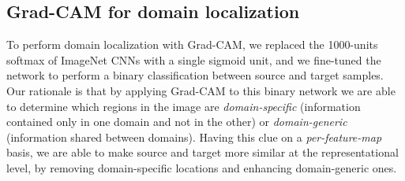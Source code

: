 \documentclass[../main.tex]{subfiles}
\begin{document}
    \subsection{Grad-CAM for domain localization}

    To perform domain localization with Grad-CAM, we replaced the 1000-units softmax of ImageNet CNNs with a single sigmoid
    unit, and we fine-tuned the network to perform a binary classification between source and target samples. Our rationale is
    that by applying Grad-CAM to this binary network we are able to determine which regions
    in the image are \textit{domain-specific} (information contained only in one domain and not in the other) or
    \textit{domain-generic} (information shared between domains). Having this clue on a \textit{per-feature-map} basis,
    we are able to make source and target more similar at the representational level, by removing domain-specific locations and
    enhancing domain-generic ones. \\
\end{document}
